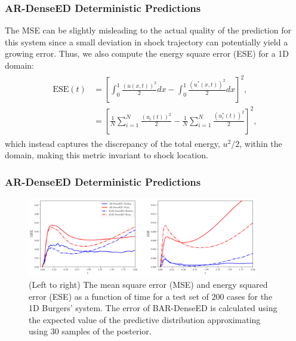 \documentclass{beamer}
\theoremstyle{remark}
\begin{document}
\begin{frame}
\frametitle{AR-DenseED Deterministic Predictions}
The MSE can be slightly misleading to the actual quality of the prediction for this system since a small deviation in shock trajectory can potentially yield a growing error.
Thus, we also compute the energy square error (ESE) for a 1D domain:
\begin{align}
    \begin{split}
        \textrm{ESE}(t) &= \left[\int_{0}^{1} \frac{(u(x,t))^{2}}{2} dx - \int_{0}^{1}\frac{(u^{*}(x,t))^{2}}{2} dx\right]^{2},\\
        &= \left[\frac{1}{N}\sum^{N}_{i=1}\frac{(u_{i}(t))^{2}}{2} - \frac{1}{N}\sum^{N}_{i=1}\frac{(u_{i}^{*}(t))^{2}}{2}\right]^{2},
        \label{eq:ese}
    \end{split}
\end{align}
which instead captures the discrepancy of the total energy, $u^{2}/2$, within the domain, making this metric invariant to shock location.

\end{frame}

\begin{frame}
\frametitle{AR-DenseED Deterministic Predictions}
%
\begin{figure}[H]
    \centering
    \includegraphics[width=0.9\textwidth]{Fig11.png}
    \caption{(Left to right) The mean square error (MSE) and energy squared error (ESE) as a function of time for a test set of $200$ cases for the 1D Burgers' system.
    The error of BAR-DenseED is calculated using the expected value of the predictive distribution approximating using $30$ samples of the posterior.}
    \label{fig:burgers1D-MSE}
\end{figure}
\end{frame}
\end{document}
